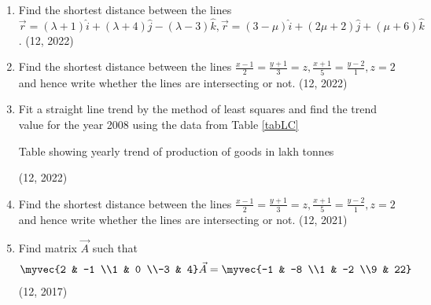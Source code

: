 \begin{enumerate}[label=\thesubsection.\arabic*,ref=\thesubsection.\theenumi]
\item Find the shortest distance between the lines
		$\vec{r}=(\lambda+1)\hat{i}+(\lambda+4)\hat{j}-(\lambda-3)\hat{k},
		\vec{r}=(3-\mu)\hat{i}+(2\mu+2)\hat{j}+(\mu+6)\hat{k}$.
\hfill (12, 2022)

\item Find the shortest distance between the lines 
		$\frac{x-1}{2}=\frac{y+1}{3}=z, \frac{x+1}{5}=\frac{y-2}{1}, z=2$
and hence write whether the lines are intersecting or not.
\hfill (12, 2022)
\item Fit a straight line trend by the method of least squares and find the trend value for the year 2008 using the data from Table \ref{tabLC}
	\begin{table}[H]
		\caption{Table showing yearly trend of production of goods in lakh tonnes \label{tabLC}}
		
	\end{table}
\hfill (12, 2022)
\item Find the shortest distance between the 
lines 
  $\frac{x-1}{2} = \frac{y+1}{3} = z,
  \frac{x+1}{5} =\frac{y-2}{1},z=2$
and hence write
whether the lines are intersecting or not.
\hfill (12, 2021)
\item Find matrix $\vec{A}$ such that
\begin{align*}
   \myvec{2 & -1 \\1 & 0 \\-3 & 4} \vec{A}=\myvec{-1 & -8 \\1 & -2 \\9 & 22} 
\end{align*} 
\hfill (12, 2017)

\end{enumerate}
